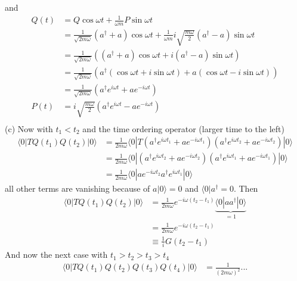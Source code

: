 \documentclass[10pt,a4paper]{book}
\theoremstyle{definition}
\begin{document}
and
\begin{align}
Q(t)&=Q\cos\omega t+\frac{1}{\omega m}P\sin\omega t\\
&=\frac{1}{\sqrt{2m\omega}}(a^\dagger+a)\cos\omega t+\frac{1}{\omega m}i\sqrt{\frac{m\omega}{2}}(a^\dagger-a)\sin\omega t\\
&=\frac{1}{\sqrt{2m\omega}}\left((a^\dagger+a)\cos\omega t+i(a^\dagger-a)\sin\omega t\right)\\
&=\frac{1}{\sqrt{2m\omega}}\left(a^\dagger(\cos\omega t+i\sin\omega t)+a(\cos\omega t-i\sin\omega t) \right)\\
&=\frac{1}{\sqrt{2m\omega}}\left(a^\dagger e^{i\omega t}+a e^{-i\omega t} \right)\\
P(t)&=i\sqrt{\frac{m\omega}{2}}\left(a^\dagger e^{i\omega t}-a e^{-i\omega t} \right)\\
\end{align}
(c) Now with $t_1<t_2$ and the time ordering operator (larger time to the left)
\begin{align}
\langle0|TQ(t_1)Q(t_2)|0\rangle
&=\frac{1}{2m\omega}\langle0|T\left(a^\dagger e^{i\omega t_1}+a e^{-i\omega t_1} \right)\left(a^\dagger e^{i\omega t_2}+a e^{-i\omega t_2} \right)|0\rangle\\
&=\frac{1}{2m\omega}\langle0|\left(a^\dagger e^{i\omega t_2}+a e^{-i\omega t_2} \right)\left(a^\dagger e^{i\omega t_1}+a e^{-i\omega t_1} \right)|0\rangle\\
&=\frac{1}{2m\omega}\langle0|a e^{-i\omega t_2}a^\dagger e^{i\omega t_1}|0\rangle
\end{align}
all other terms are vanishing because of $a|0\rangle=0$ and $\langle0|a^\dagger=0$. Then
\begin{align}
\langle0|TQ(t_1)Q(t_2)|0\rangle
&=\frac{1}{2m\omega}e^{-i\omega (t_2-t_1)}\underbrace{\langle0|a a^\dagger |0\rangle}_{=1}\\
&=\frac{1}{2m\omega}e^{-i\omega (t_2-t_1)}\\
&\equiv\frac{1}{i}G(t_2-t_1)
\end{align}
And now the next case with $t_1>t_2>t_3>t_4$
\begin{align}
\langle0|TQ(t_1)Q(t_2)Q(t_3)Q(t_4)|0\rangle
&=\frac{1}{(2m\omega)^2}...
\end{align}
\end{document}

